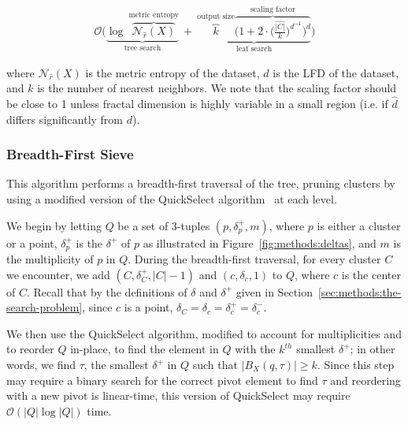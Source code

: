 \begin{gather}
    \mathcal{O}
    \Bigg(
        \underbrace{
            \log~\overbrace{\mathcal{N}_{\hat{r}}(X)}^{\textrm{metric entropy}}
        }_{\textrm{tree search}}
        \ + \ 
        \underbrace{
            \overbrace{k}^{\textrm{output size}}
            \overbrace{\bigg( 1 + 2 \cdot \Big( \frac{\hat{|C|}}{k} \Big) ^ {d^{-1}} \bigg)^d}^{\textrm{scaling factor}}
        }_{\textrm{leaf search}}
    \Bigg)
    \label{eq:methods:repeated-rnn-complexity}
\end{gather}

where $\mathcal{N}_{\hat{r}}(X)$ is the metric entropy of the dataset, $d$ is the LFD of the dataset, and $k$ is the number of nearest neighbors.
We note that the scaling factor should be close to 1 unless fractal dimension is highly variable in a small region (i.e. if $\hat{d}$ differs significantly from $d$).


\subsubsection{Breadth-First Sieve}
\label{sec:methods:knn-search:bredth-first-sieve}

This algorithm performs a breadth-first traversal of the tree, pruning clusters by using a modified version of the QuickSelect algorithm~\cite{hoare1961algorithm} at each level.

We begin by letting $Q$ be a set of 3-tuples $(p, \delta^{+}_{p}, m)$, where $p$ is either a cluster or a point, $\delta^{+}_{p}$ is the $\delta^{+}$ of $p$ as illustrated in Figure~\ref{fig:methods:deltas}, and $m$ is the multiplicity of $p$ in $Q$.
During the breadth-first traversal, for every cluster $C$ we encounter, we add $(C, \delta^{+}_{C}, |C| - 1)$ and $(c, \delta_{c}, 1)$ to $Q$, where $c$ is the center of $C$.
Recall that by the definitions of $\delta$ and $\delta^{+}$ given in Section~\ref{sec:methods:the-search-problem}, since $c$ is a point, $\delta_{C} = \delta_{c} = \delta^{+}_{c} = \delta^{-}_{c}$.

We then use the QuickSelect algorithm, modified to account for multiplicities and to reorder $Q$ in-place, to find the element in $Q$ with the $k^{th}$ smallest $\delta^{+}$; in other words, we find $\tau$, the smallest $\delta^{+}$ in $Q$ such that $\left| B_X(q, \tau) \right| \geq k$.
Since this step may require a binary search for the correct pivot element to find $\tau$ and reordering with a new pivot is linear-time, this version of QuickSelect may require $\mathcal{O}(|Q| \log |Q|)$ time.


